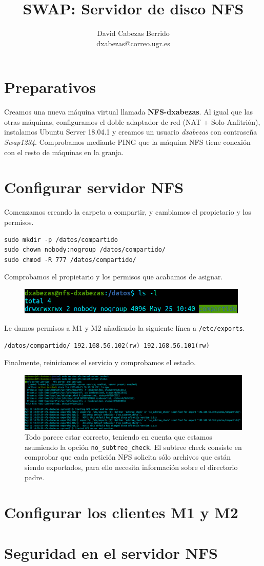 \documentclass{article}
\title{\Huge SWAP: Servidor de disco NFS\vspace{10mm}}
\author{\huge David Cabezas Berrido \vspace{10mm} \\ 
  \huge dxabezas@correo.ugr.es \vspace{10mm}}
\begin{document}
\maketitle
\tableofcontents
\newpage

\section{Preparativos}

Creamos una nueva máquina virtual llamada \textbf{NFS-dxabezas}. Al igual que las otras máquinas, configuramos el doble adaptador de red
(NAT + Solo-Anfitrión), instalamos Ubuntu Server 18.04.1 y creamos un usuario \emph{dxabezas} con contraseña \emph{Swap1234}.
Comprobamos mediante PING que la máquina NFS tiene conexión con el resto de máquinas en la granja.

\section{Configurar servidor NFS}

Comenzamos creando la carpeta a compartir, y cambiamos el propietario y los permisos.

\begin{Verbatim}
sudo mkdir -p /datos/compartido
sudo chown nobody:nogroup /datos/compartido/
sudo chmod -R 777 /datos/compartido/
\end{Verbatim}

Comprobamos el propietario y los permisos que acabamos de asignar.

\begin{figure}[H]
	\centering
	\includegraphics[width=110mm]{imgs/compartido-ls-l}
\end{figure}

Le damos permisos a M1 y M2 añadiendo la siguiente línea a \texttt{/etc/exports}.
\begin{Verbatim}
/datos/compartido/ 192.168.56.102(rw) 192.168.56.101(rw)
\end{Verbatim}

Finalmente, reiniciamos el servicio y comprobamos el estado.
\begin{figure}[H]
	\centering
	\includegraphics[width=180mm]{imgs/status}
	\caption{Todo parece estar correcto, teniendo en cuenta que estamos asumiendo la opción \texttt{no\_subtree\_check}. El subtree check consiste
	en comprobar que cada petición NFS solicita sólo archivos que están siendo exportados, para ello necesita información sobre el directorio
	padre.}
\end{figure}

\section{Configurar los clientes M1 y M2}

\section{Seguridad en el servidor NFS}
\end{document}
